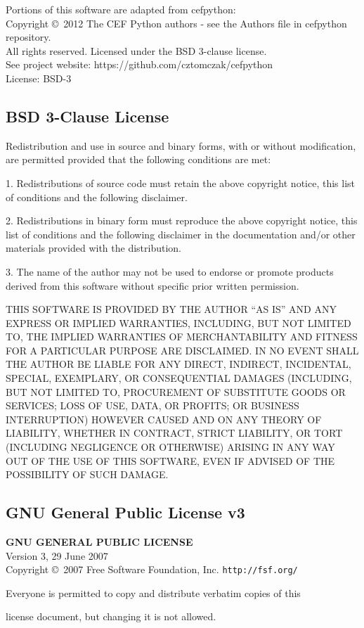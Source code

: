 \documentclass[10pt]{article}
\begin{document}
\noindent Portions of this software are adapted from cefpython: \\
Copyright \copyright\ 2012 The CEF Python authors - see the Authors file in cefpython repository. \\
All rights reserved. Licensed under the BSD 3-clause license. \\
See project website: https://github.com/cztomczak/cefpython \\
License: BSD-3 \\


\clearpage
\subsection{BSD 3-Clause License}
Redistribution and use in source and binary forms, with or without
modification, are permitted provided that the following conditions
are met:

1. Redistributions of source code must retain the above copyright
   notice, this list of conditions and the following disclaimer.

2. Redistributions in binary form must reproduce the above copyright
   notice, this list of conditions and the following disclaimer in the
   documentation and/or other materials provided with the distribution.

3. The name of the author may not be used to endorse or promote products
   derived from this software without specific prior written permission.

THIS SOFTWARE IS PROVIDED BY THE AUTHOR ``AS IS'' AND ANY EXPRESS OR
IMPLIED WARRANTIES, INCLUDING, BUT NOT LIMITED TO, THE IMPLIED WARRANTIES
OF MERCHANTABILITY AND FITNESS FOR A PARTICULAR PURPOSE ARE DISCLAIMED.
IN NO EVENT SHALL THE AUTHOR BE LIABLE FOR ANY DIRECT, INDIRECT,
INCIDENTAL, SPECIAL, EXEMPLARY, OR CONSEQUENTIAL DAMAGES (INCLUDING, BUT
NOT LIMITED TO, PROCUREMENT OF SUBSTITUTE GOODS OR SERVICES; LOSS OF USE,
DATA, OR PROFITS; OR BUSINESS INTERRUPTION) HOWEVER CAUSED AND ON ANY
THEORY OF LIABILITY, WHETHER IN CONTRACT, STRICT LIABILITY, OR TORT
(INCLUDING NEGLIGENCE OR OTHERWISE) ARISING IN ANY WAY OUT OF THE USE OF
THIS SOFTWARE, EVEN IF ADVISED OF THE POSSIBILITY OF SUCH DAMAGE.

\clearpage
\subsection{GNU General Public License v3}
\begin{center}
{\parindent 0in
\textbf{GNU GENERAL PUBLIC LICENSE}\\
Version 3, 29 June 2007 \\

Copyright \copyright\  2007 Free Software Foundation, Inc. \texttt{http://fsf.org/}

\bigskip
Everyone is permitted to copy and distribute verbatim copies of this

license document, but changing it is not allowed.}

\end{center}
\end{document}
